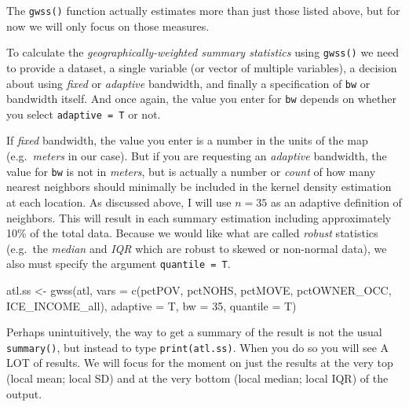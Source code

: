 \documentclass[
]{book}
\newenvironment{Shaded}{\begin{snugshade}}{\end{snugshade}}
\newcommand{\AttributeTok}[1]{\textcolor[rgb]{0.77,0.63,0.00}{#1}}
\newcommand{\DecValTok}[1]{\textcolor[rgb]{0.00,0.00,0.81}{#1}}
\newcommand{\FunctionTok}[1]{\textcolor[rgb]{0.00,0.00,0.00}{#1}}
\newcommand{\NormalTok}[1]{#1}
\newcommand{\OtherTok}[1]{\textcolor[rgb]{0.56,0.35,0.01}{#1}}
\newcommand{\StringTok}[1]{\textcolor[rgb]{0.31,0.60,0.02}{#1}}
\begin{document}
The \texttt{gwss()} function actually estimates more than just those listed above, but for now we will only focus on those measures.

To calculate the \emph{geographically-weighted summary statistics} using \texttt{gwss()} we need to provide a dataset, a single variable (or vector of multiple variables), a decision about using \emph{fixed} or \emph{adaptive} bandwidth, and finally a specification of \texttt{bw} or bandwidth itself. And once again, the value you enter for \texttt{bw} depends on whether you select \texttt{adaptive\ =\ T} or not.

If \emph{fixed} bandwidth, the value you enter is a number in the units of the map (e.g.~\emph{meters} in our case). But if you are requesting an \emph{adaptive} bandwidth, the value for \texttt{bw} is not in \emph{meters}, but is actually a number or \emph{count} of how many nearest neighbors should minimally be included in the kernel density estimation at each location. As discussed above, I will use \(n=35\) as an adaptive definition of neighbors. This will result in each summary estimation including approximately 10\% of the total data. Because we would like what are called \emph{robust} statistics (e.g.~the \emph{median} and \emph{IQR} which are robust to skewed or non-normal data), we also must specify the argument \texttt{quantile\ =\ T}.

\begin{Shaded}
\begin{Highlighting}[]
\NormalTok{atl.ss }\OtherTok{\textless{}{-}} \FunctionTok{gwss}\NormalTok{(atl, }\AttributeTok{vars =} \FunctionTok{c}\NormalTok{(}\StringTok{\textquotesingle{}pctPOV\textquotesingle{}}\NormalTok{, }\StringTok{\textquotesingle{}pctNOHS\textquotesingle{}}\NormalTok{, }\StringTok{\textquotesingle{}pctMOVE\textquotesingle{}}\NormalTok{, }\StringTok{\textquotesingle{}pctOWNER\_OCC\textquotesingle{}}\NormalTok{,}
                             \StringTok{\textquotesingle{}ICE\_INCOME\_all\textquotesingle{}}\NormalTok{),}
               \AttributeTok{adaptive =}\NormalTok{ T,}
               \AttributeTok{bw =} \DecValTok{35}\NormalTok{,}
               \AttributeTok{quantile =}\NormalTok{ T)}
\end{Highlighting}
\end{Shaded}

Perhaps unintuitively, the way to get a summary of the result is not the usual \texttt{summary()}, but instead to type \texttt{print(atl.ss)}. When you do so you will see A LOT of results. We will focus for the moment on just the results at the very top (local mean; local SD) and at the very bottom (local median; local IQR) of the output.
\end{document}
